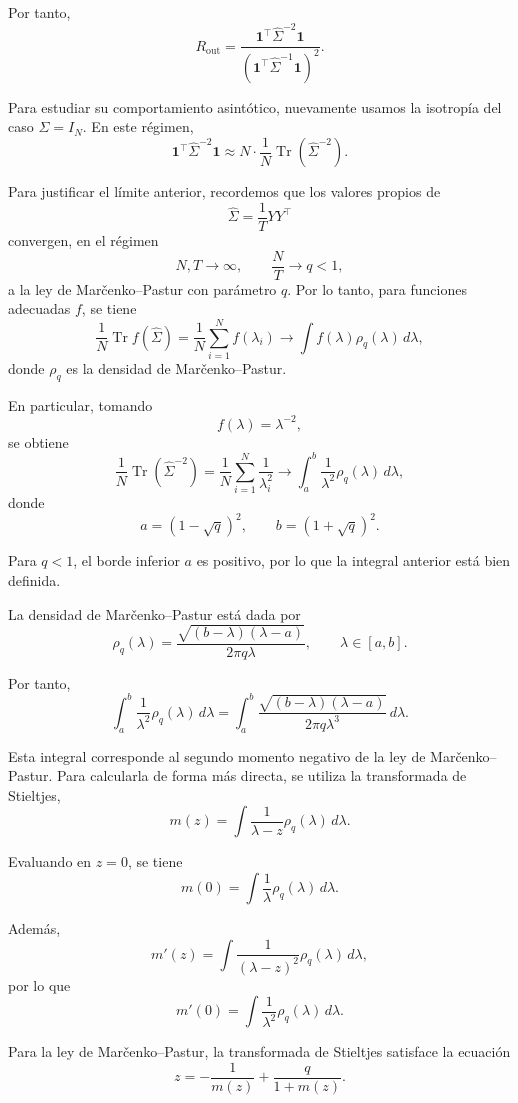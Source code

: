 \documentclass[letterpaper,12pt,oneside]{book}
\begin{document}
Por tanto,
\[
R_{\mathrm{out}}
=
\frac{
\mathbf{1}^{\top}
\widehat{\Sigma}^{-2}
\mathbf{1}
}{
\left(
\mathbf{1}^{\top}
\widehat{\Sigma}^{-1}
\mathbf{1}
\right)^2
}.
\]

Para estudiar su comportamiento asintótico, nuevamente usamos la isotropía del caso \(\Sigma=I_N\). En este régimen,
\[
\mathbf{1}^{\top}
\widehat{\Sigma}^{-2}
\mathbf{1}
\approx
N\cdot
\frac{1}{N}
\operatorname{Tr}
\left(
\widehat{\Sigma}^{-2}
\right).
\]

Para justificar el límite anterior, recordemos que los valores propios de
\[
\widehat{\Sigma}
=
\frac{1}{T}YY^\top
\]
convergen, en el régimen
\[
N,T\to\infty,
\qquad
\frac{N}{T}\to q<1,
\]
a la ley de Marčenko--Pastur con parámetro \(q\). Por lo tanto, para funciones adecuadas \(f\), se tiene
\[
\frac{1}{N}
\operatorname{Tr}
f(\widehat{\Sigma})
=
\frac{1}{N}
\sum_{i=1}^N
f(\lambda_i)
\longrightarrow
\int f(\lambda)\rho_q(\lambda)\,d\lambda,
\]
donde \(\rho_q\) es la densidad de Marčenko--Pastur.

En particular, tomando
\[
f(\lambda)=\lambda^{-2},
\]
se obtiene
\[
\frac{1}{N}
\operatorname{Tr}
\left(
\widehat{\Sigma}^{-2}
\right)
=
\frac{1}{N}
\sum_{i=1}^N
\frac{1}{\lambda_i^2}
\longrightarrow
\int_a^b
\frac{1}{\lambda^2}
\rho_q(\lambda)\,d\lambda,
\]
donde
\[
a=(1-\sqrt q)^2,
\qquad
b=(1+\sqrt q)^2.
\]

Para \(q<1\), el borde inferior \(a\) es positivo, por lo que la integral anterior está bien definida.

La densidad de Marčenko--Pastur está dada por
\[
\rho_q(\lambda)
=
\frac{
\sqrt{(b-\lambda)(\lambda-a)}
}{
2\pi q \lambda
},
\qquad
\lambda\in[a,b].
\]

Por tanto,
\[
\int_a^b
\frac{1}{\lambda^2}
\rho_q(\lambda)\,d\lambda
=
\int_a^b
\frac{
\sqrt{(b-\lambda)(\lambda-a)}
}{
2\pi q \lambda^3
}
\,d\lambda.
\]

Esta integral corresponde al segundo momento negativo de la ley de Marčenko--Pastur. Para calcularla de forma más directa, se utiliza la transformada de Stieltjes,
\[
m(z)
=
\int
\frac{1}{\lambda-z}
\rho_q(\lambda)\,d\lambda.
\]

Evaluando en \(z=0\), se tiene
\[
m(0)
=
\int
\frac{1}{\lambda}
\rho_q(\lambda)\,d\lambda.
\]

Además,
\[
m'(z)
=
\int
\frac{1}{(\lambda-z)^2}
\rho_q(\lambda)\,d\lambda,
\]
por lo que
\[
m'(0)
=
\int
\frac{1}{\lambda^2}
\rho_q(\lambda)\,d\lambda.
\]

Para la ley de Marčenko--Pastur, la transformada de Stieltjes satisface la ecuación
\[
z
=
-\frac{1}{m(z)}
+
\frac{q}{1+m(z)}.
\]
\end{document}
